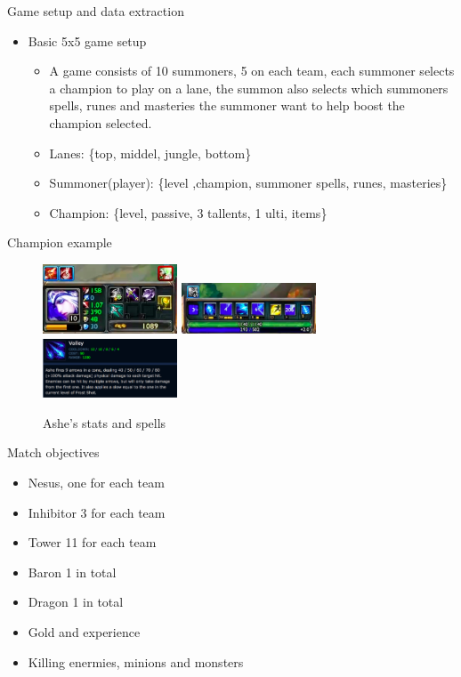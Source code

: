 \begin{frame}{Game setup and data extraction}
\begin{itemize}
\item Basic 5x5 game setup
\begin{itemize}
\item A game consists of 10 summoners, 5 on each team, each summoner selects a champion to play on a lane, the summon also selects which summoners spells, runes and masteries the summoner want to help boost the champion selected.   
\item Lanes: \{top, middel, jungle, bottom\}
\item Summoner(player): \{level ,champion, summoner spells, runes, masteries\}
\item Champion: \{level, passive, 3 tallents, 1 ulti, items\}
\end{itemize}
\end{itemize}
\vspace{20cm}
\end{frame}
\begin{frame}{Champion example}
\begin{figure}[h!]
\centering
\includegraphics[width=4cm]{leagueoflegends/ashe1}
\includegraphics[width=4cm]{leagueoflegends/ashe2}
\includegraphics[width=4cm]{leagueoflegends/volly}
\caption{Ashe's stats and spells}
\end{figure}
\end{frame}
\begin{frame}{Match objectives}
\begin{itemize}
\item Nesus, one for each team 
\item Inhibitor 3 for each team 
\item Tower 11 for each team 
\item Baron 1 in total
\item Dragon 1 in total
\item Gold and experience
\item Killing enermies, minions and monsters 
\end{itemize}
\end{frame}
